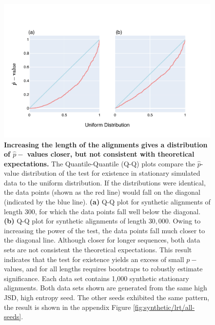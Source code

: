 \begin{figure}[htbp]
\centering
\includegraphics[width=\textwidth]{figures/plots/synthetic/lrt/197113_332182_17210-long_seq.pdf}
\caption{\textbf{Increasing the length of the alignments gives a distribution of $\hat p-$ values closer, but not consistent with theoretical expectations.} The Quantile-Quantile (Q-Q) plots compare the $\hat p$-value distribution of the test for existence in stationary simulated data to the uniform distribution. If the distributions were identical, the data points (shown as the red line) would fall on the diagonal (indicated by the blue line). \textbf{(a)} Q-Q plot for synthetic alignments of length $300$, for which the data points fall well below the diagonal. \textbf{(b)} Q-Q plot for synthetic alignments of length $30,000$. Owing to increasing the power of the test, the data points fall much closer to the diagonal line. Although closer for longer sequences, both data sets are not consistent the theoretical expectations. This result indicates that the test for existence yields an excess of small $p-$ values, and for all lengths requires bootstraps to robustly estimate significance. Each data set contains 1,000 synthetic stationary alignments. Both data sets shown are generated from the same high JSD, high entropy seed. The other seeds exhibited the same pattern, the result is shown in the appendix Figure \ref{fig:synthetic/lrt/all-seeds}.}
\label{fig:synthetic/lrt/197113-long_seq}
\end{figure}